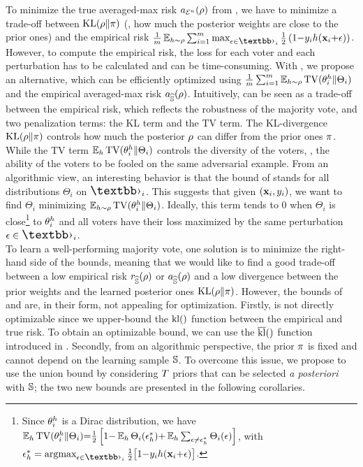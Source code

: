 To minimize the true averaged-max risk $\RiskMS_{\Dpert^{n}}(\Q)$ from  , we have to minimize a trade-off between
$\KL(\Q\|\P)$ (\ie, how much the posterior weights are close to the prior ones) and the empirical risk $\frac{1}{\m}\EE_{\h\sim\Q}\sum_{i=1}^{\m}\max_{\epsilon\in\Epert_i}\tfrac{1}{2}\LP1{-}\y_i\h(\x_i{+}\epsilon)\RP$.
However, to compute the empirical risk, the loss for each voter and each perturbation has to be calculated and can be time-consuming.
With , we propose an alternative, which can be efficiently optimized using $\frac{1}{\m}\sum_{i=1}^{\m}\EE_{\h\sim\Q}\TV(\theta_i^{\h}\|\Theta_i)$ and the empirical averaged-max risk $\RiskMS_{\Spert}(\Q)$.
Intuitively,  can be seen as a trade-off between the empirical risk, which reflects the robustness of the majority vote, and two penalization terms: the KL term and the TV term.
The KL-divergence $\KL(\Q\|\P)$ controls how much the posterior $\Q$ can differ from the prior ones $\P$. 
While the TV term $\EE_{\h}\TV(\theta_i^{\h}\|\Theta_i)$ controls the diversity of the voters, \ie, the ability of the voters to be fooled on the same adversarial example.
From an algorithmic view, an interesting behavior  is that the bound of  stands for all distributions $\Theta_i$ on $\Epert_i$.
This suggests that
given  $(\x_i, \y_i)$, we want to find $\Theta_i$ minimizing 
 $\EE_{\h\sim\Q}\TV(\theta_i^{\h}\|\Theta_i)$.
 Ideally, this term tends to $0$ when  $\Theta_i$ is close\footnote{Since $\theta_i^{\h}$ is a Dirac distribution, we have $\EE_{\h}\TV(\theta_i^{\h}\|\Theta_i){=}\frac{1}{2}\LB1{-}\EE_{\h}\Theta_i(\epsilon_{\h}^*) {+} \EE_{\h}\sum_{\epsilon\ne \epsilon_{\h}^*} \Theta_i(\epsilon)\RB$, with $\epsilon_{\h}^*=\argmax_{\epsilon\in\Epert_i}\frac{1}{2}\big[1{-}\y_i\h(\x_i{+}\epsilon)\big]$.} to $\theta_i^{\h}$ 
and all voters have their loss maximized by the same \mbox{perturbation $\epsilon\in\Epert_i$}.\\

To learn a well-performing majority vote, one solution is to minimize the right-hand side of the bounds, meaning that we would like to find a good trade-off between  a low empirical risk $\RiskS_{\Spert}(\Q)$ or $\RiskMS_{\Spert}(\Q)$ and  a low divergence between the prior weights and the learned posterior ones $\KL(\Q\|\P)$.
However, the bounds of  and  are, in their form, not appealing for optimization.
Firstly,  is not directly optimizable since we upper-bound the $\kl()$ function between the empirical and true risk. 
To obtain an optimizable bound, we can use the $\klmax()$ function introduced in .
Secondly, from an algorithmic perspective, the prior $\P$ is fixed and cannot depend on the learning sample $\S$.
To overcome this issue, we propose to use the union bound by considering $\iter$ priors that can be selected {\it a posteriori} with $\S$; the two new bounds are presented in the following corollaries.

